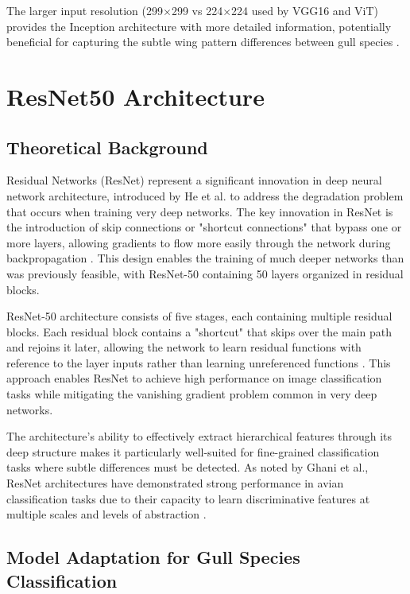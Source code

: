 \documentclass[a4paper,12pt]{article}
\begin{document}
The larger input resolution (299$\times$299 vs 224$\times$224 used by VGG16 and ViT) provides the Inception architecture with more detailed information, potentially beneficial for capturing the subtle wing pattern differences between gull species \citep{dosovitskiy2020image}.


\section{ResNet50 Architecture}

\subsection{Theoretical Background}

Residual Networks (ResNet) represent a significant innovation in deep neural network architecture, introduced by He et al. to address the degradation problem that occurs when training very deep networks. The key innovation in ResNet is the introduction of skip connections or "shortcut connections" that bypass one or more layers, allowing gradients to flow more easily through the network during backpropagation \citep{he2016deep}. This design enables the training of much deeper networks than was previously feasible, with ResNet-50 containing 50 layers organized in residual blocks.

ResNet-50 architecture consists of five stages, each containing multiple residual blocks. Each residual block contains a "shortcut" that skips over the main path and rejoins it later, allowing the network to learn residual functions with reference to the layer inputs rather than learning unreferenced functions \citep{he2016deep, he2016identity}. This approach enables ResNet to achieve high performance on image classification tasks while mitigating the vanishing gradient problem common in very deep networks.

The architecture's ability to effectively extract hierarchical features through its deep structure makes it particularly well-suited for fine-grained classification tasks where subtle differences must be detected. As noted by Ghani et al., ResNet architectures have demonstrated strong performance in avian classification tasks due to their capacity to learn discriminative features at multiple scales and levels of abstraction \citep{ghani2024comprehensive}.

\subsection{Model Adaptation for Gull Species Classification}
\end{document}
